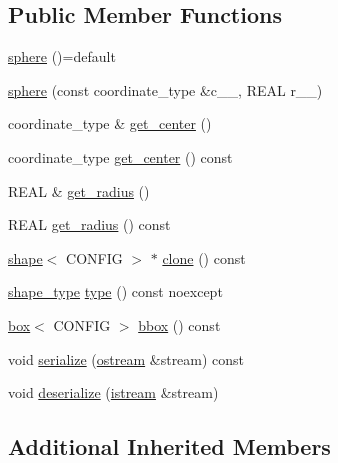 \subsection*{Public Member Functions}
\begin{DoxyCompactItemize}
\item 
\hyperlink{classmui_1_1geometry_1_1sphere_a51dd09ce04cca08525760688bded685f}{sphere} ()=default
\item 
\hyperlink{classmui_1_1geometry_1_1sphere_aab6366d5ef9df6c490f0a18cd5f0bcfd}{sphere} (const coordinate\+\_\+type \&c\+\_\+\+\_\+, R\+E\+AL r\+\_\+\+\_\+)
\item 
coordinate\+\_\+type \& \hyperlink{classmui_1_1geometry_1_1sphere_a552ce4c615b891f460d2365c8c1298b8}{get\+\_\+center} ()
\item 
coordinate\+\_\+type \hyperlink{classmui_1_1geometry_1_1sphere_a1270b07da59c323d6e5c0a6657448c18}{get\+\_\+center} () const
\item 
R\+E\+AL \& \hyperlink{classmui_1_1geometry_1_1sphere_a2a3c043438da3e2c69ebe300f2865419}{get\+\_\+radius} ()
\item 
R\+E\+AL \hyperlink{classmui_1_1geometry_1_1sphere_aacde4471508b9478f5513f45326a8c3b}{get\+\_\+radius} () const
\item 
\hyperlink{classmui_1_1geometry_1_1shape}{shape}$<$ C\+O\+N\+F\+IG $>$ $\ast$ \hyperlink{classmui_1_1geometry_1_1sphere_a7cb7ff26e352d733ce5194d83c4d4065}{clone} () const
\item 
\hyperlink{namespacemui_1_1geometry_a5f311a343181e2f20482e5c9afb0f136}{shape\+\_\+type} \hyperlink{classmui_1_1geometry_1_1sphere_a2440f819caae9c92a2cf8c253989c38f}{type} () const noexcept
\item 
\hyperlink{classmui_1_1geometry_1_1box}{box}$<$ C\+O\+N\+F\+IG $>$ \hyperlink{classmui_1_1geometry_1_1sphere_a08cbc924590d6c82989eac785dab05d4}{bbox} () const
\item 
void \hyperlink{classmui_1_1geometry_1_1sphere_a5f937c4e7878adb9cc8d07b7b9b76131}{serialize} (\hyperlink{classmui_1_1ostream}{ostream} \&stream) const
\item 
void \hyperlink{classmui_1_1geometry_1_1sphere_a6b9d913f4d05b03f2dd07f48387e0c77}{deserialize} (\hyperlink{classmui_1_1istream}{istream} \&stream)
\end{DoxyCompactItemize}
\subsection*{Additional Inherited Members}


